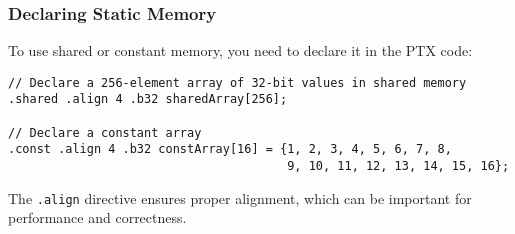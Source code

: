 \subsubsection{Declaring Static Memory}

To use shared or constant memory, you need to declare it in the PTX code:

\begin{lstlisting}[style=ptx]
// Declare a 256-element array of 32-bit values in shared memory
.shared .align 4 .b32 sharedArray[256];

// Declare a constant array
.const .align 4 .b32 constArray[16] = {1, 2, 3, 4, 5, 6, 7, 8,
                                       9, 10, 11, 12, 13, 14, 15, 16};
\end{lstlisting}

The \texttt{.align} directive ensures proper alignment, which can be important for performance and correctness.

